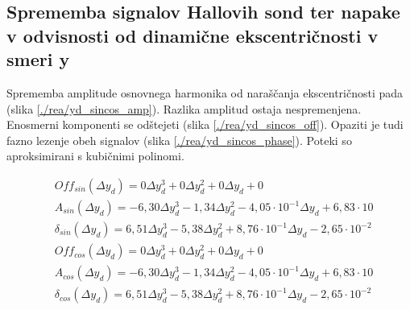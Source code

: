 \subsection{Sprememba signalov Hallovih sond ter napake v odvisnosti od dinamične ekscentričnosti v smeri y}
Sprememba amplitude osnovnega harmonika od naraščanja ekscentričnosti pada (slika \ref{./rea/yd_sincos_amp}). Razlika amplitud ostaja nespremenjena. Enosmerni komponenti se odštejeti (slika \ref{./rea/yd_sincos_off}). Opaziti je tudi fazno lezenje obeh signalov (slika \ref{./rea/yd_sincos_phase}).  Poteki so aproksimirani s kubičnimi polinomi.

\begin{eqnarray}
&Off_{sin}(\Delta y_d) =0\Delta y_d^{3}+0\Delta y_d^{2}+0\Delta y_d+0 \\
&A_{sin}(\Delta y_d) =-6,30\Delta y_d^{3}-1,34\Delta y_d^{2}-4,05\cdot 10^{-1}\Delta y_d+6,83\cdot 10 \\                                 
&\delta_{sin}(\Delta y_d) =6,51\Delta y_d^{3}-5,38\Delta y_d^{2}+8,76\cdot 10^{-1}\Delta y_d-2,65\cdot 10^{-2} \\  
&Off_{cos}(\Delta y_d) =0\Delta y_d^{3}+0\Delta y_d^{2}+0\Delta y_d+0 \\
&A_{cos}(\Delta y_d) =-6,30\Delta y_d^{3}-1,34\Delta y_d^{2}-4,05\cdot 10^{-1}\Delta y_d+6,83\cdot 10 \\                                 
&\delta_{cos}(\Delta y_d) =6,51\Delta y_d^{3}-5,38\Delta y_d^{2}+8,76\cdot 10^{-1}\Delta y_d-2,65\cdot 10^{-2} 
\end{eqnarray}

